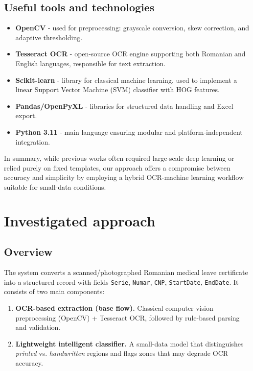 \documentclass[runningheads,a4paper,11pt]{report}
\begin{document}
\section*{Useful tools and technologies}
\begin{itemize}
  \item \textbf{OpenCV} - used for preprocessing: grayscale conversion, skew correction, and adaptive thresholding.
  \item \textbf{Tesseract OCR} - open-source OCR engine supporting both Romanian and English languages, responsible for text extraction.
  \item \textbf{Scikit-learn} - library for classical machine learning, used to implement a linear Support Vector Machine (SVM) classifier with HOG features.
  \item \textbf{Pandas/OpenPyXL} - libraries for structured data handling and Excel export.
  \item \textbf{Python 3.11} - main language ensuring modular and platform-independent integration.
\end{itemize}

In summary, while previous works often required large-scale deep learning or relied purely on fixed templates, our approach offers a compromise between accuracy and simplicity by employing a hybrid OCR-machine learning workflow suitable for small-data conditions.


\chapter{Investigated approach}
\label{chapter:proposedApproach}

\section*{Overview}
The system converts a scanned/photographed Romanian medical leave certificate into a structured record with fields
\texttt{Serie}, \texttt{Numar}, \texttt{CNP}, \texttt{StartDate}, \texttt{EndDate}.
It consists of two main components:
\begin{enumerate}
  \item \textbf{OCR-based extraction (base flow).} Classical computer vision preprocessing (OpenCV) + Tesseract OCR, followed by rule-based parsing and validation.
  \item \textbf{Lightweight intelligent classifier.} A small-data model that distinguishes \emph{printed} vs. \emph{handwritten} regions and flags zones that may degrade OCR accuracy.
\end{enumerate}
\end{document}
